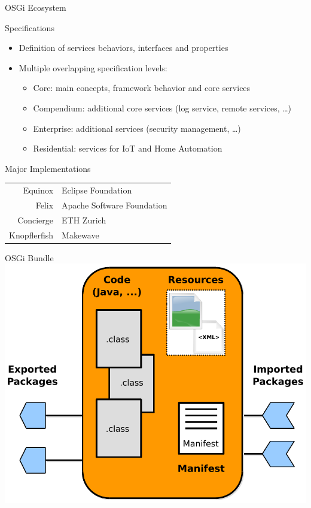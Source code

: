 \begin{frame}{OSGi Ecosystem}
\begin{block}{Specifications}
\begin{itemize}
\item Definition of services behaviors, interfaces and properties
\item Multiple overlapping specification levels:
\begin{itemize}
\item Core: main concepts, framework behavior and core services
\item Compendium: additional core services (log service, remote services, \ldots)
\item Enterprise: additional services (security management, \ldots)
\item Residential: services for IoT and Home Automation
\end{itemize}
\end{itemize}
\end{block}

\begin{block}{Major Implementations}
\begin{center}
\begin{tabular}{rl}
Equinox & Eclipse Foundation\\
Felix & Apache Software Foundation\\
Concierge & ETH Zurich\\
Knopflerfish & Makewave\\
\end{tabular}
\end{center}
\end{block}
\end{frame}

\begin{frame}{OSGi Bundle}
\centering
\includegraphics[height=.8\textheight]{../imgs/bundle}
\end{frame}

